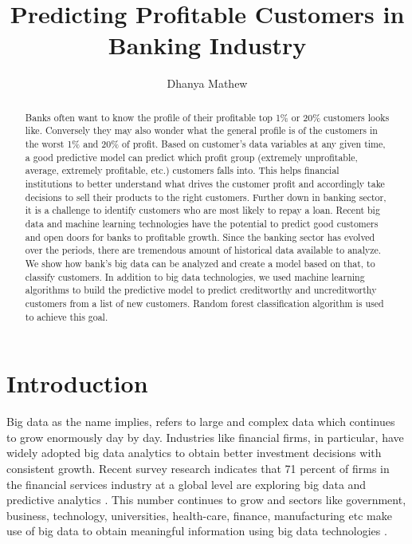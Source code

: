 \documentclass[sigconf]{acmart}
\begin{document}
\title{Predicting Profitable Customers in Banking Industry}


\author{Dhanya Mathew}


\renewcommand{\shortauthors}{G. v. Laszewski}


\begin{abstract}
Banks often want to know the profile of their profitable top 1\% or 20\% customers looks like. Conversely they may also wonder what the general profile is of the customers in the worst 1\% and 20\% of profit. Based on customer’s data variables at any given time, a good predictive model can predict which profit group (extremely unprofitable, average, extremely profitable, etc.) customers falls into. This helps financial institutions to better understand what drives the customer profit and accordingly take decisions to sell their products to the right customers. Further down in banking sector, it is a challenge to identify customers who are most likely to repay a loan. Recent big data and machine learning technologies have the potential to predict good customers and open doors for banks to profitable growth. Since the banking sector has evolved over the periods, there are tremendous amount of historical data available to analyze. We show how bank's big data can be analyzed and create a model based on that, to classify customers. In addition to big data technologies, we used machine learning algorithms to build the predictive model to predict creditworthy and uncreditworthy customers from a list of new customers. Random forest classification algorithm is used to achieve this goal.

\end{abstract}



\maketitle



\section{Introduction}

Big data as the name implies, refers to large and complex data which continues to grow enormously day by day. Industries like financial firms, in particular, have widely adopted big data analytics to obtain better investment decisions with consistent growth. Recent survey research indicates that 71 percent of firms in the financial services industry at a global level are exploring big data and predictive analytics \cite{accenture-next-generation-financial}. This number continues to grow and sectors like government, business, technology, universities, health-care, finance, manufacturing etc make use of big data to obtain meaningful information using big data technologies \cite{wiki-bigdata}. 
\end{document}
